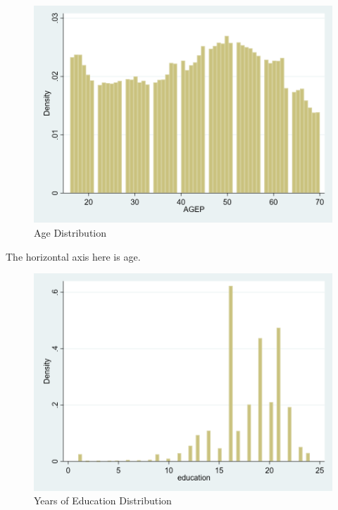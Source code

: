 \documentclass[12pt]{article}
\begin{document}
\begin{figure}[H]
\centering
\caption{Age Distribution}
\includegraphics[scale=0.35]{age.png}
\end{figure}
\begin{center}
\footnotesize The horizontal axis here is age.
\end{center}
\begin{figure}[H]
\centering
\caption{Years of Education Distribution}
\includegraphics[scale=0.35]{eduhist.png}
\end{figure}
\end{document}
